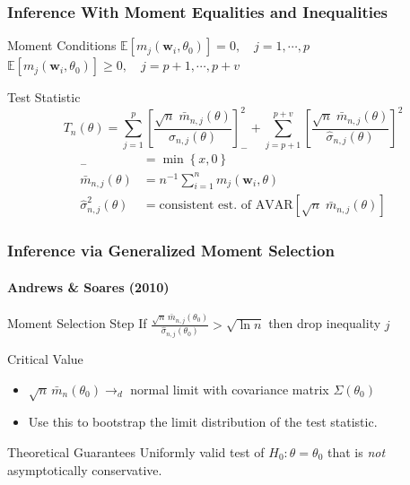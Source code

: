 \documentclass{beamer}
\begin{document}
\begin{frame}
  \frametitle{Inference With Moment Equalities and Inequalities}
  \small

\begin{block}{Moment Conditions}
  $\mathbb{E} \left[ m_j(\mathbf{w}_i,\theta_0) \right] = 0, \quad j = 1, \cdots, p$\\
  $\mathbb{E} \left[ m_j(\mathbf{w}_i,\theta_0) \right]  \geq 0, \quad j = p+1, \cdots, p + v$
\end{block}


\begin{block}{Test Statistic}
  \vspace{-1em}
\[
  T_n(\theta) = \sum_{j=1}^p \left[\frac{\sqrt{n}\; \bar{m}_{n,j}(\theta)}{\widehat{\sigma}_{n,j}(\theta)}\right]^2_- + \sum_{j=p+1}^{p+v} \left[\frac{\sqrt{n}\; \bar{m}_{n,j}(\theta)}{\widehat{\sigma}_{n,j}(\theta)}\right]^2
\]
\footnotesize
\begin{align*}
[x]_- &= \min\left\{ x, 0 \right\}\\
\bar{m}_{n,j}(\theta) &= n^{-1} \sum_{i=1}^{n} m_j(\mathbf{w}_i, \theta)\\
\widehat{\sigma}^2_{n,j}(\theta) &=  \mbox{consistent est.\ of } \mbox{AVAR}\left[  \sqrt{n}\; \bar{m}_{n,j}(\theta)\right]
\end{align*}
\end{block}

\end{frame}
\begin{frame}
  \frametitle{Inference via Generalized Moment Selection}
  \framesubtitle{Andrews \& Soares (2010)}

  \begin{block}{Moment Selection Step}
    If $\displaystyle\frac{\sqrt{n}\,\bar{m}_{n,j}(\theta_0)}{\widehat{\sigma}_{n,j}(\theta_0)} > \sqrt{\ln n}$ then drop inequality $j$
  \end{block}

  \begin{block}{Critical Value} 
    \begin{itemize}
      \item $\sqrt{n}\, \bar{m}_n(\theta_0) \rightarrow_d$ normal limit with covariance matrix $\Sigma(\theta_0)$
      \item Use this to bootstrap the limit distribution of the test statistic.
    \end{itemize}
  \end{block}

  \begin{block}{Theoretical Guarantees}
    Uniformly valid test of $H_0\colon \theta = \theta_0$ that is \emph{not} asymptotically conservative. 
  \end{block}

\end{frame}
\end{document}
